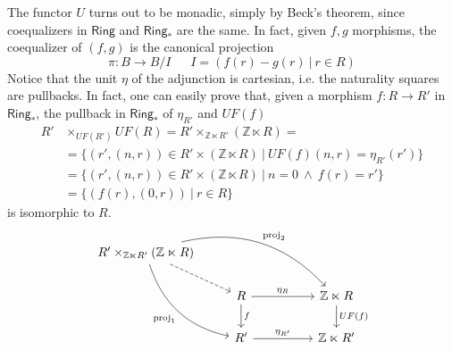 The functor $U$ turns out to be monadic, simply by Beck's theorem, since coequalizers in $\mathsf{Ring}$ and $\mathsf{Ring_*}$ are the same. In fact, given $f,g$ morphisms, the coequalizer of $(f,g)$ is the canonical projection
\[\pi: B \to B/I \ \ \ \ \ \ \ I = (f(r) - g(r) \ | \ r \in R)\]
Notice that the unit $\eta$ of the adjunction is cartesian, i.e. the naturality squares are pullbacks. In fact, one can easily prove that, given a morphism $f:R \to R'$ in $\mathsf{Ring_*}$, the pullback in $\mathsf{Ring_*}$ of $\eta_{R'}$ and $UF(f)$
\begin{align*}
R'&\times_{UF(R')} UF(R) = R'\times_{\mathbb{Z}\ltimes R'} (\mathbb{Z}\ltimes R) = \\[1.5ex]
&= \{ (r',(n,r)) \in R'\times (\mathbb{Z}\ltimes R) \ | \  UF(f)(n,r) = \eta_{R'}(r') \} \\[1.5ex]
&=\{ (r',(n,r)) \in R'\times (\mathbb{Z}\ltimes R) \ | \ n=0 \ \land \ f(r)=r' \} \\[1.5ex]
&=\{ (f(r),(0,r)) \ | \  r \in R \}
\end{align*}
is isomorphic to $R$.
\[
\begin{tikzcd}
 R'\times_{\mathbb{Z}\ltimes R'} (\mathbb{Z}\ltimes R) \arrow[rdd, "\mathrm{proj}_1"', bend right] \arrow[rrrd, "\mathrm{proj}_2", bend left] \arrow[rd, dashed] &                                       &  &                                       \\
                                                                                                                                                               & R \arrow[d, "f"] \arrow[rr, "\eta_R"] &  & \mathbb{Z}\ltimes R \arrow[d, "UF(f)"] \\
                                                                                                                                                               & R' \arrow[rr, "\eta_{R'}"]            &  & \mathbb{Z}\ltimes R'                  
\end{tikzcd}
\]










